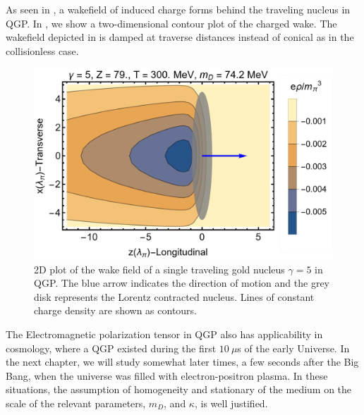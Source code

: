 As seen in , a wakefield of induced charge forms behind the traveling nucleus in QGP. In , we show a two-dimensional contour plot of the charged wake. The wakefield depicted in  is damped at traverse distances instead of conical as in the collisionless case.
\begin{figure}[ht]
\centering
\includegraphics[width=0.85\linewidth]{plots/chap02QCD/chwake.png}
\caption{2D plot of the wake field of a single traveling gold nucleus $\gamma = 5$ in QGP. The blue arrow indicates the direction of motion and the grey disk represents the Lorentz contracted nucleus. Lines of constant charge density are shown as contours. \label{fig:chgwake}}
\end{figure}


The Electromagnetic polarization tensor in QGP also has applicability in cosmology, where a QGP existed during the first $10~\mu$s of the early Universe. In the next chapter, we will study somewhat later times, a few seconds after the Big Bang, when the universe was filled with electron-positron plasma. In these situations, the assumption of homogeneity and stationary of the medium on the scale of the relevant parameters, $m_D$, and $\kappa$, is well justified.








